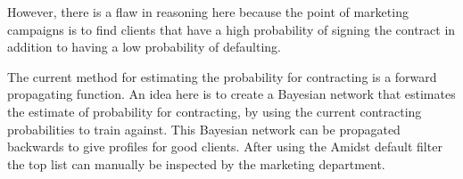 \documentclass{article}
\theoremstyle{theorem}
\theoremstyle{definition}
\newcommand{\bv}[1]{\bm{#1}}
\begin{document}
However, there is a flaw in reasoning here because the point of marketing campaigns is to find clients that have a high probability of signing the contract in addition to having a low probability of defaulting.  

The current method for estimating the probability for contracting is a forward propagating function.  An idea here is to create a Bayesian network that estimates the estimate of probability for contracting, by using the current contracting probabilities to train against.  This Bayesian network can be propagated backwards to give profiles for good clients.  After using the Amidst default filter the top list can manually be inspected by the marketing department. 

%
%
%
%
%
%
%
%
%
%
\end{document}

